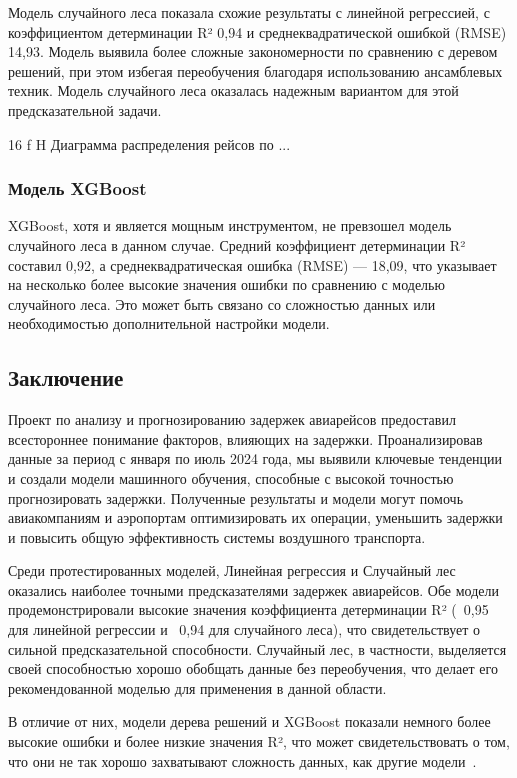 Модель случайного леса показала схожие результаты с линейной регрессией, с коэффициентом детерминации R² 0,94 и среднеквадратической ошибкой (RMSE) 14,93.
Модель выявила более сложные закономерности по сравнению с деревом решений, при этом избегая переобучения благодаря использованию ансамблевых техник.
Модель случайного леса оказалась надежным вариантом для этой предсказательной задачи.

{16}
{f}
{H}
{\textwidth}
{Диаграмма распределения рейсов по ...}

\subsubsection{Модель XGBoost}

XGBoost, хотя и является мощным инструментом, не превзошел модель случайного леса в данном случае.
Средний коэффициент детерминации R² составил 0,92, а среднеквадратическая ошибка (RMSE) — 18,09, что указывает на несколько более высокие значения ошибки по сравнению с моделью случайного леса.
Это может быть связано со сложностью данных или необходимостью дополнительной настройки модели.

\subsection{Заключение}

Проект по анализу и прогнозированию задержек авиарейсов предоставил всестороннее понимание факторов, влияющих на задержки.
Проанализировав данные за период с января по июль 2024 года, мы выявили ключевые тенденции и создали модели машинного обучения, способные с высокой точностью прогнозировать задержки.
Полученные результаты и модели могут помочь авиакомпаниям и аэропортам оптимизировать их операции, уменьшить задержки и повысить общую эффективность системы воздушного транспорта.


Среди протестированных моделей, Линейная регрессия и Случайный лес оказались наиболее точными предсказателями задержек авиарейсов.
Обе модели продемонстрировали высокие значения коэффициента детерминации R² (~0,95 для линейной регрессии и ~0,94 для случайного леса), что свидетельствует о сильной предсказательной способности.
Случайный лес, в частности, выделяется своей способностью хорошо обобщать данные без переобучения, что делает его рекомендованной моделью для применения в данной области.


В отличие от них, модели дерева решений и XGBoost показали немного более высокие ошибки и более низкие значения R², что может свидетельствовать о том, что они не так хорошо захватывают сложность данных, как другие модели~\cite{medium}.









